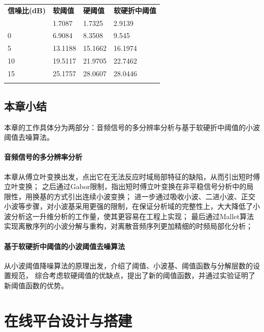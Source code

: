 \documentclass{morningstar}
\begin{document}
\begin{table}[htb]
    \centering
    \begin{tabular}{|p{3cm}|p{3cm}|p{3cm}|p{3cm}|}
    \thickhline
    \textbf{信噪比(dB)} & \textbf{软阈值} & \textbf{硬阈值} & \textbf{软硬折中阈值} \\
    \thickhline
    -5               & 1.7087       & 1.7325       & 2.9139          \\
    \hline
    0                & 6.9084       & 8.3508       & 9.545           \\
    \hline
    5                & 13.1188      & 15.1662      & 16.1974         \\
    \hline
    10               & 19.5117      & 21.9705      & 22.7462         \\
    \hline
    15               & 25.1757      & 28.0607      & 28.0446         \\
    \thickhline
    \end{tabular}
\end{table}



\clearpage
\subsection{本章小结}
本章的工作具体分为两部分：音频信号的多分辨率分析与基于软硬折中阈值的小波阈值去噪算法。

\paragraph{音频信号的多分辨率分析}
本章从傅立叶变换出发，点出它在无法反应时域局部特征的缺陷，从而引出短时傅立叶变换；
之后通过Gabor限制，指出短时傅立叶变换在非平稳信号分析中的局限性，用换基的方式引出连续小波变换；
进一步通过吸收小波、二进小波、正交小波等步骤，对小波基采用更强的限制，在保证分析域的完整性上，大大降低了小波分析这一升维分析的工作量，使其更容易在工程上实现；
最后通过Mallet算法实现离散序列的小波分解与重构，对离散音频序列更加精细的时频局部化分析；

\paragraph{基于软硬折中阈值的小波阈值去噪算法}
从小波阈值降噪算法的原理出发，介绍了阈值、小波基、阈值函数与分解层数的设置规范，
综合考虑软硬阈值的优缺点，提出了新的阈值函数，并通过实验证明了新阈值函数的优势。

\clearpage
\section{在线平台设计与搭建}
\end{document}
